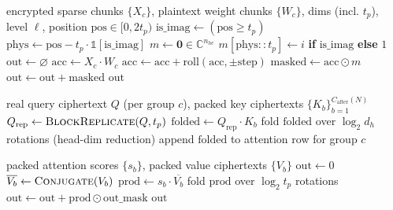 \documentclass[11pt]{article}
\newcommand{\conj}[1]{\overline{#1}}
\begin{document}
\begin{algorithm}[H]
\caption{\texttt{vmm\_kv} with paired real/imaginary positions}
\begin{algorithmic}[1]
\Require encrypted sparse chunks $\{X_c\}$, plaintext weight chunks $\{W_c\}$,
  dims (incl. $t_p$), level $\ell$, position $\mathrm{pos} \in [0, 2t_p)$
\State $\mathrm{is\_imag} \gets (\mathrm{pos} \ge t_p)$
\State $\mathrm{phys} \gets \mathrm{pos} - t_p \cdot \mathbb{1}[\mathrm{is\_imag}]$
\State $m \gets \mathbf{0} \in \mathbb{C}^{n_{he}}$
\State $m[\mathrm{phys} :: t_p] \gets i$ \textbf{if} $\mathrm{is\_imag}$ \textbf{else} $1$
\State $\mathrm{out} \gets \varnothing$
  \State $\mathrm{acc} \gets X_c \cdot W_c$ 
   
    \State $\mathrm{acc} \gets \mathrm{acc} + \mathrm{roll}(\mathrm{acc}, \pm\mathrm{step})$
  \EndFor
  \State $\mathrm{masked} \gets \mathrm{acc} \odot m$ 
  \State $\mathrm{out} \gets \mathrm{out} + \mathrm{masked}$
\EndFor
\State \Return $\mathrm{out}$
\end{algorithmic}
\end{algorithm}

\begin{algorithm}[H]
\caption{Packed $QK^\top$ (\texttt{qkt\_gqa\_he})}
\begin{algorithmic}[1]
\Require real query ciphertext $Q$ (per group $c$), packed key ciphertexts $\{K_b\}_{b=1}^{C_{\text{after}}(N)}$
\State $Q_{\mathrm{rep}} \gets \textsc{BlockReplicate}(Q, t_p)$
  \State $\mathrm{folded} \gets Q_{\mathrm{rep}} \cdot K_b$ 
  \State fold $\mathrm{folded}$ over $\log_2 d_h$ rotations (head-dim reduction)
  \State append $\mathrm{folded}$ to attention row for group $c$
\EndFor
\end{algorithmic}
\end{algorithm}

\begin{algorithm}[H]
\caption{Packed scores$\times V$ (\texttt{softmax\_v\_gqa\_he})}
\begin{algorithmic}[1]
\Require packed attention scores $\{s_b\}$, packed value ciphertexts $\{V_b\}$
\State $\mathrm{out} \gets 0$
  \State $\conj{V_b} \gets \textsc{Conjugate}(V_b)$ 
  \State $\mathrm{prod} \gets s_b \cdot \conj{V_b}$ 
  \State fold $\mathrm{prod}$ over $\log_2 t_p$ rotations
  \State $\mathrm{out} \gets \mathrm{out} + \mathrm{prod} \odot \mathrm{out\_mask}$ 
\EndFor
\State \Return $\mathrm{out}$ 
\end{algorithmic}
\end{algorithm}
\end{document}
